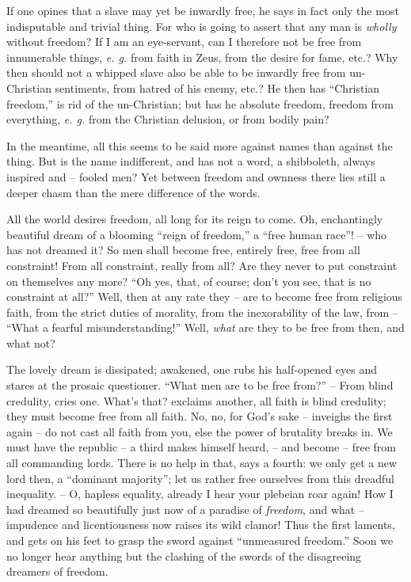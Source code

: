 \documentclass[12pt,a4paper]{book}
\begin{document}
If one opines that a slave may yet be inwardly free, he says in fact only the 
most indisputable and trivial thing. For who is going to assert that any man 
is \textit{wholly} without freedom? If I am an eye-servant, can I therefore 
not be free from innumerable things, \textit{e. g.} from faith in Zeus, from 
the desire for fame, etc.? Why then should not a whipped slave also be able to 
be inwardly free from un-Christian sentiments, from hatred of his enemy, etc.? 
He then has ``Christian freedom,'' is rid of the un-Christian; but has he 
absolute freedom, freedom from everything, \textit{e. g.} from the Christian 
delusion, or from bodily pain?

In the meantime, all this seems to be said more against names than against the 
thing. But is the name indifferent, and has not a word, a shibboleth, always 
inspired and -- fooled men? Yet between freedom and ownness there lies still a 
deeper chasm than the mere difference of the words.

All the world desires freedom, all long for its reign to come. Oh, 
enchantingly beautiful dream of a blooming ``reign of freedom,'' a ``free 
human race''! -- who has not dreamed it? So men shall become free, entirely 
free, free from all constraint! From all constraint, really from all? Are they 
never to put constraint on themselves any more? ``Oh yes, that, of course; 
don't you see, that is no constraint at all?'' Well, then at any rate they -- 
are to become free from religious faith, from the strict duties of morality, 
from the inexorability of the law, from -- ``What a fearful 
misunderstanding!'' Well, \textit{what} are they to be free from then, and 
what not?

The lovely dream is dissipated; awakened, one rubs his half-opened eyes and 
stares at the prosaic questioner. ``What men are to be free from?'' -- From 
blind credulity, cries one. What's that? exclaims another, all faith is blind 
credulity; they must become free from all faith. No, no, for God's sake -- 
inveighs the first again -- do not cast all faith from you, else the power of 
brutality breaks in. We must have the republic -- a third makes himself heard, 
-- and become -- free from all commanding lords. There is no help in that, 
says a fourth: we only get a new lord then, a ``dominant majority''; let us 
rather free ourselves from this dreadful inequality. -- O, hapless equality, 
already I hear your plebeian roar again! How I had dreamed so beautifully just 
now of a paradise of \textit{freedom}, and what -- impudence and 
licentiousness now raises its wild clamor! Thus the first laments, and gets on 
his feet to grasp the sword against ``unmeasured freedom.'' Soon we no 
longer hear anything but the clashing of the swords of the disagreeing 
dreamers of freedom.
\end{document}
